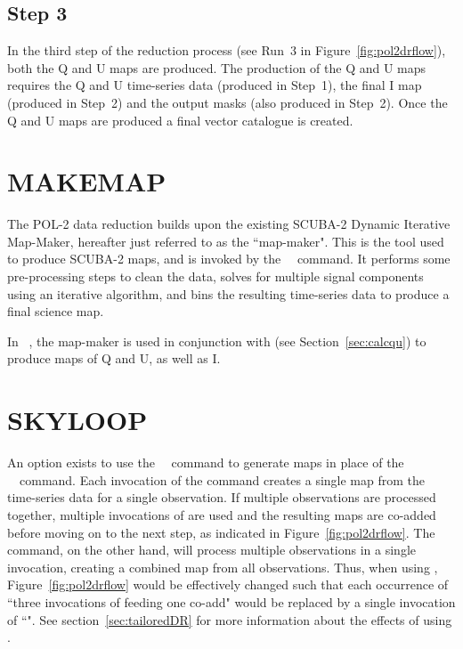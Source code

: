 \subsection*{Step 3}

In the third step of the reduction process (see Run~3 in
Figure~\ref{fig:pol2drflow}), both the Q and U maps are produced. The production
of the Q and U maps requires the Q and U time-series data (produced in
Step~1), the final I map (produced in Step~2) and the output masks (also
produced in Step~2). Once the Q and U maps are produced a final vector
catalogue is created.

\section{MAKEMAP}

The POL-2 data reduction builds upon the existing SCUBA-2 Dynamic
Iterative Map-Maker, hereafter just referred to as the ``map-maker". This
is the tool used to produce SCUBA-2 maps, and is invoked by the
\SMURF\ \makemap\ command. It performs some
pre-processing steps to clean the data, solves for multiple signal
components using an iterative algorithm, and bins the resulting
time-series data to produce a final science map.

In \poltwomap\ , the map-maker is used in conjunction with
 (see
Section~\ref{sec:calcqu}) to produce maps of Q and U, as well as I.

\section{SKYLOOP}
\label{sec:skyloop}

An option exists to use the \SMURF\ \skyloop\  command to generate maps
in place of the \SMURF\ \makemap\ command. Each invocation of the
 command creates a single map from the time-series data
for a single observation. If multiple observations are processed together,
multiple invocations of  are used and the resulting maps are
co-added before moving on to the next step, as indicated in
Figure~\ref{fig:pol2drflow}. The  command, on the other hand,
will process multiple observations in a single invocation, creating a combined
map from all observations. Thus, when using ,
Figure~\ref{fig:pol2drflow} would be effectively changed such that each occurrence
of ``three invocations of  feeding one co-add" would be replaced
by a single invocation of ``". See section~\ref{sec:tailoredDR}
for more information about the effects of using .

